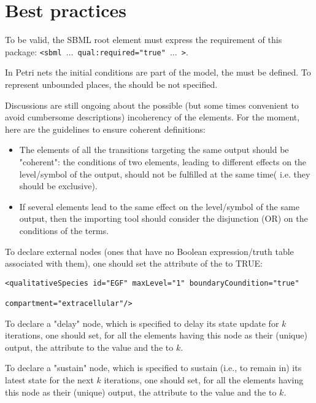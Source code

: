 
\section{Best practices}
\label{best-practices}

\ALL To be valid, the SBML root element must express the requirement of this package: \texttt{<sbml $\dots$ qual:required="true" $\dots$ >}.

\medskip
\PN In Petri nets the initial conditions are part of the model, the  must be defined.
To represent unbounded places, the  should be not specified.

\medskip
\LRG Discussions are still ongoing about the possible (but some times convenient to avoid cumbersome descriptions) incoherency of the  elements. For the moment, here are the guidelines to ensure coherent definitions:
\begin{itemize}
\item The  elements of all the transitions targeting the same output should be "coherent": the conditions of two  elements, leading to different effects on the level/symbol of the output, should not be fulfilled at the same time( i.e. they should be exclusive).
\item If several  elements lead to the same effect on the level/symbol of the same output, then the importing tool should consider the disjunction (OR) on the conditions of the terms. 
\end{itemize}

\medskip
\LRG To declare external nodes (ones that have no Boolean expression/truth table associated with them), one should set the attribute  of the   to TRUE: 
\begin{verbatim}
<qualitativeSpecies id="EGF" maxLevel="1" boundaryCoundition="true" 
                                                  compartment="extracellular"/> 
\end{verbatim}

\medskip
\LRG To declare a "delay" node, which is specified to delay its state update for $k$ iterations, one should set, for all the  elements having this node as their (unique) output, the attribute  to the value  and the  to $k$. 

\medskip
\LRG To declare a "sustain" node, which is specified to sustain (i.e., to remain in) its latest state for the next $k$ iterations, one should set, for all the  elements having this node as their (unique) output, the attribute  to the value  and the  to $k$. 



